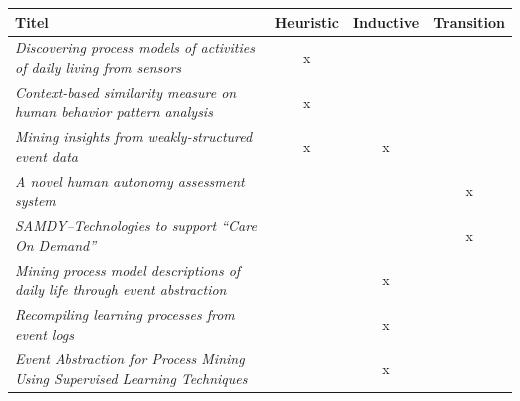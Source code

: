 \newcolumntype{b}{X}
\begin{table}[!ht]\small
\centering
\begin{tabularx}{\textwidth}{b ccc}
\hline
Titel                                                                                                               & \multicolumn{1}{l}{\textbf{Heuristic}} & \multicolumn{1}{l}{\textbf{Inductive}} & \multicolumn{1}{l}{\textbf{Transition}} \\ \hline\hline
\textit{Discovering process models of activities of daily living from sensors} \cite{adl1}                                      & x                                      &                                        &                                         \\
\textit{Context-based similarity measure on human behavior pattern analysis} \cite{adl2}                                        & x                                      &                                        &                                         \\
\textit{Mining insights from weakly-structured event data} \cite{adl3}                                                          & x                                      & x                                      &                                         \\
\textit{A novel human autonomy assessment system} \cite{adl4}                                                                   &                                        &                                        & x                                       \\
\textit{SAMDY–Technologies to support “Care On Demand”} \cite{adl5}                                                              &                                        &                                        & x                                       \\
\textit{Mining process model descriptions of daily life through event abstraction} \cite{adl6}                                  &                                        & x                                      &                                         \\
\textit{Recompiling learning processes from event logs} \cite{adl7}                                                             &                                        & x                                      &                                         \\
\textit{Event Abstraction for Process Mining Using Supervised Learning Techniques} \cite{adl8}                                  &                                        & x                                      &                                         \\

\end{tabularx}
\end{table}
